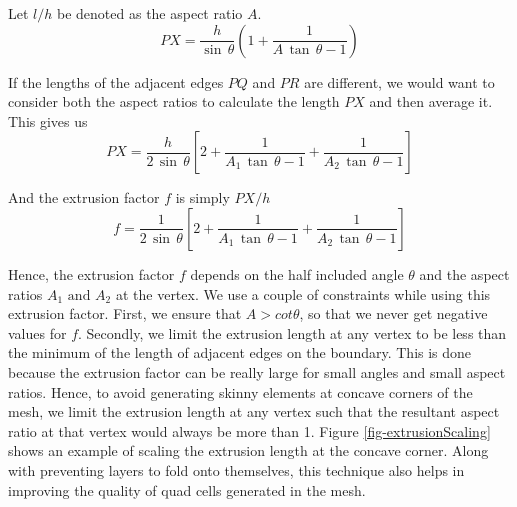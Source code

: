 \documentclass[conf]{new-aiaa}
\begin{document}
Let $l/h$ be denoted as the aspect ratio $A$.
\begin{equation}
    \mathit{PX}  = \dfrac{h}{\sin \, \theta} \left( 1 + \dfrac{1}{A\, \tan \, \theta - 1} \right)
\end{equation}

If the lengths of the adjacent edges $PQ$ and $PR$ are different, we would want to consider both the aspect ratios to calculate the length $PX$ and then average it. This gives us
\begin{equation}
    \mathit{PX} = \dfrac{h}{2 \, \sin\, \theta} \left[ 2 + \dfrac{1}{A_1\, \tan \, \theta - 1} + \dfrac{1}{A_2\, \tan \, \theta - 1} \right]
\end{equation}

And the extrusion factor $f$ is simply $PX/h$
\begin{equation}
    f = \dfrac{1}{2 \, \sin \, \theta} \left[ 2 + \dfrac{1}{A_1\, \tan \, \theta - 1} + \dfrac{1}{A_2\, \tan \, \theta - 1} \right]
\end{equation}

Hence, the extrusion factor $f$ depends on the half included angle $\theta$ and the aspect ratios $A_1 \text{ and } A_2$ at the vertex. We use a couple of constraints while using this extrusion factor. First, we ensure that $A > cot \theta$, so that we never get negative values for $f$. Secondly, we limit the extrusion length at any vertex to be less than the minimum of the length of adjacent edges on the boundary. This is done because the extrusion factor can be  really large for small angles and small aspect ratios. Hence, to avoid generating skinny elements at concave corners of the mesh, we limit the extrusion length at any vertex such that the resultant aspect ratio at that vertex would always be more than 1. Figure \ref{fig-extrusionScaling} shows an example of scaling the extrusion length at the concave corner. Along with preventing layers to fold onto themselves, this technique also helps in improving the quality of quad cells generated in the mesh.

\end{document}
